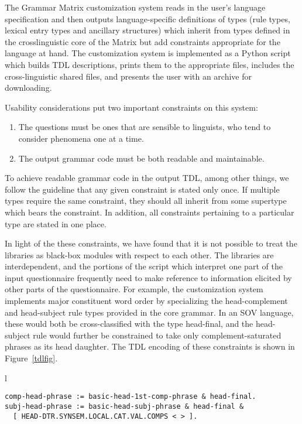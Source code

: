 \documentclass[11pt]{article}
\begin{document}
The Grammar Matrix customization system reads in the user's language
specification and then outputs language-specific definitions of types
(rule types, lexical entry types and ancillary structures) which
inherit from types defined in the crosslinguistic core of the Matrix
but add constraints appropriate for the language at hand. The customization
system is implemented as a Python script which builds TDL descriptions,
prints them to the appropriate files, includes the cross-linguistic
shared files, and presents the user with an archive for downloading.

Usability considerations put two important constraints on this system:

\begin{enumerate}
\item The questions must be ones that are sensible to linguists,
who tend to consider phenomena one at a time.  
\item The output grammar code must be both readable and maintainable.
\end{enumerate}
%
To achieve readable grammar code in the output TDL, among other
things, we follow the guideline that any given constraint is
stated only once.  If multiple types require the same constraint, they
should all inherit from some supertype which bears the constraint.
In addition, all constraints pertaining to a particular type are
stated in one place.

In light of the these constraints, we
have found that it is not possible to treat the libraries as black-box
modules with respect to each other.  The libraries are interdependent,
and the portions of the script which interpret one part of the input
questionnaire frequently need to make reference to information
elicited by other parts of the questionnaire.  For example, the
customization system implements major constituent word order by
specializing the head-complement and head-subject rule types provided
in the core grammar.  In an SOV language, these would both be
cross-classified with the type head-final, and the head-subject rule
would further be constrained to take only complement-saturated phrases
as its head daughter.  The TDL encoding of these constraints is shown
in Figure~\ref{tdlfig}.

\begin{figure*}[ht]
\small
\begin{center}
\begin{tabular}{l}
\begin{minipage}{5in}
\begin{verbatim}
comp-head-phrase := basic-head-1st-comp-phrase & head-final.
subj-head-phrase := basic-head-subj-phrase & head-final &
  [ HEAD-DTR.SYNSEM.LOCAL.CAT.VAL.COMPS < > ].
\end{verbatim}
\end{minipage}\\
\end{tabular}
\end{center}
\caption{Specialized phrase structure rule types for SOV language}
\label{tdlfig}
\end{figure*}
\end{document}
